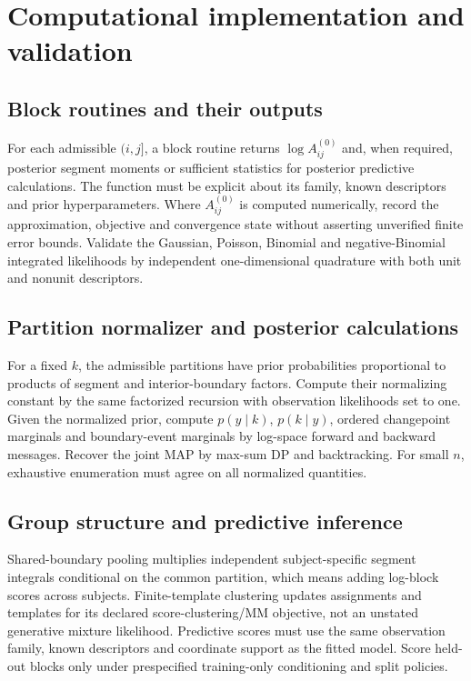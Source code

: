 \chapter{Computational implementation and validation}
\label{app:implementation}
\label{app:code}

\section{Block routines and their outputs}
For each admissible $(i,j]$, a block routine returns $\log A_{ij}^{(0)}$ and, when required,
posterior segment moments or sufficient statistics for posterior predictive calculations. The
function must be explicit about its family, known descriptors and prior hyperparameters. Where
$A_{ij}^{(0)}$ is computed numerically, record the approximation, objective and convergence state
without asserting unverified finite error bounds. Validate the Gaussian, Poisson, Binomial and
negative-Binomial integrated likelihoods by independent one-dimensional quadrature with both
unit and nonunit descriptors.

\section{Partition normalizer and posterior calculations}
For a fixed $k$, the admissible partitions have prior probabilities proportional to products
of segment and interior-boundary factors. Compute their normalizing constant by the same
factorized recursion with observation likelihoods set to one. Given the normalized prior,
compute $p(y\mid k)$, $p(k\mid y)$, ordered changepoint marginals and boundary-event marginals
by log-space forward and backward messages. Recover the joint MAP by max-sum DP and
backtracking. For small $n$, exhaustive enumeration must agree on all normalized quantities.

\section{Group structure and predictive inference}
Shared-boundary pooling multiplies independent subject-specific segment integrals conditional
on the common partition, which means adding log-block scores across subjects. Finite-template
clustering updates assignments and templates for its declared score-clustering/MM objective,
not an unstated generative mixture likelihood. Predictive scores must use the same observation
family, known descriptors and coordinate support as the fitted model. Score held-out blocks only
under prespecified training-only conditioning and split policies.

